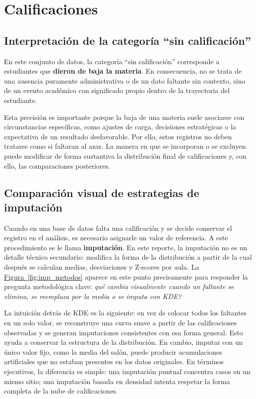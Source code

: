 \documentclass[8pt,a4paper]{article} %
\numberwithin{figure}{subsection}
\begin{document}
\FloatBarrier
\newpage
\section{Calificaciones}

\subsection{Interpretación de la categoría ``sin calificación''}
En este conjunto de datos, la categoría ``sin calificación'' corresponde a estudiantes que \textbf{dieron de baja la materia}. En consecuencia, no se trata de una ausencia puramente administrativa o de un dato faltante sin contexto, sino de un evento académico con significado propio dentro de la trayectoria del estudiante.

Esta precisión es importante porque la baja de una materia suele asociarse con circunstancias específicas, como ajustes de carga, decisiones estratégicas o la expectativa de un resultado desfavorable. Por ello, estos registros no deben tratarse como si faltaran al azar. La manera en que se incorporan o se excluyen puede modificar de forma sustantiva la distribución final de calificaciones y, con ello, las comparaciones posteriores.

\subsection{Comparación visual de estrategias de imputación}
Cuando en una base de datos falta una calificación y se decide conservar el registro en el análisis, es necesario asignarle un valor de referencia. A este procedimiento se le llama \textbf{imputación}. En este reporte, la imputación no es un detalle técnico secundario: modifica la forma de la distribución a partir de la cual después se calculan medias, desviaciones y Z-scores por aula. La \hyperref[fig:imp_metodos]{Figura~\ref{fig:imp_metodos}} aparece en este punto precisamente para responder la pregunta metodológica clave: \emph{qué cambia visualmente cuando un faltante se elimina, se reemplaza por la media o se imputa con KDE?}

La intuición detrás de KDE es la siguiente: en vez de colocar todos los faltantes en un solo valor, se reconstruye una curva suave a partir de las calificaciones observadas y se generan imputaciones consistentes con esa forma general. Esto ayuda a conservar la estructura de la distribución. En cambio, imputar con un único valor fijo, como la media del salón, puede producir acumulaciones artificiales que no estaban presentes en los datos originales. En términos ejecutivos, la diferencia es simple: una imputación puntual concentra casos en un mismo sitio; una imputación basada en densidad intenta respetar la forma completa de la nube de calificaciones.
\end{document}
